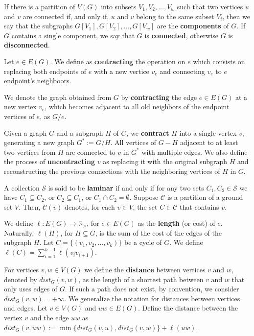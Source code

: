 If there is a partition of \(V(G)\) into subsets \(V_1 , V_2 , \dots, V_w\) such that two vertices \(u\) and \(v\) are connected if, and only if, \(u\) and \(v\) belong to the same subset \(V_i\), then we say that the subgraphs \(G[V_1], G[V_2], \dots, G[V_w]\) are the \textbf{components} of \(G\). If \(G\) contains a single component, we say that \(G\) is \textbf{connected}, otherwise \(G\) is \textbf{disconnected}.

Let \(e \in E(G)\). We define as \textbf{contracting} the operation on \(e\) which consists on replacing both endpoints of \(e\) with a new vertice \(v_e\) and connecting \(v_e\) to \(e\) endpoint's neighboors.

We denote the graph obtained from \(G\) by \textbf{contracting} the edge \(e \in E(G)\) at a new vertex \(v_e\), which becomes adjacent to all old neighbors of the endpoint vertices of \(e\), as \(G / e\).

Given a graph \(G\) and a subgraph \(H\) of \(G\), we \textbf{contract} \(H\) into a single vertex \(v\), generating a new graph \(G^\ast := G / H\). All vertices of \(G - H\) adjacent to at least two vertices from \(H\) are connected to \(v\) in \(G^\ast\) with multiple edges. We also define the process of \textbf{uncontracting} \(v\) as replacing it with the original subgraph \(H\) and reconstructing the previous connections with the neighboring vertices of \(H\) in \(G\).

A collection \(\mathcal{S}\) is said to be \textbf{laminar} if and only if for any two sets \(C_1, C_2 \in \mathcal{S}\) we have \(C_1 \subseteq C_2\), or \(C_2 \subseteq C_1\), or \(C_1 \cap C_2 = \emptyset\). Suppose \(\mathcal{C}\) is a partition of a ground set \(V\). Then, \(\mathcal{C}(v)\) denotes, for each \(v \in V\), the set \(C \in \mathcal{C}\) that contains \(v\).

We define \(\ell \colon E(G) \to \mathbb{R}_\ge\), for \(e \in E(G)\) as the \textbf{length} (or cost) of \(e\). Naturally, \(\ell(H)\), for \(H \subseteq G\), is the sum of the cost of the edges of the subgraph \(H\). Let \(C = \{(v_1, v_2, \dots, v_k)\}\) be a cycle of \(G\). We define \(\ell(C) = \sum_{i=1}^{k-1} \ell(v_i v_{i+1})\).

For vertices \(v, w \in V(G)\) we define the \textbf{distance} between vertices $v$ and $w$, denoted by \(dist_G(v, w)\), as the length of a shortest path between \(v\) and \(w\) that only uses edges of \(G\). If such a path does not exist, by convention, we consider \(dist_G(v, w) = +\infty\). We generalize the notation for distances between vertices and edges. Let \(v \in V(G)\) and \(uw \in E(G)\). Define the distance between the vertex \(v\) and the edge \(uw\) as \(dist_G(v, uw) := \min\{dist_G(v, u), dist_G(v, w)\} + \ell(uw)\).

